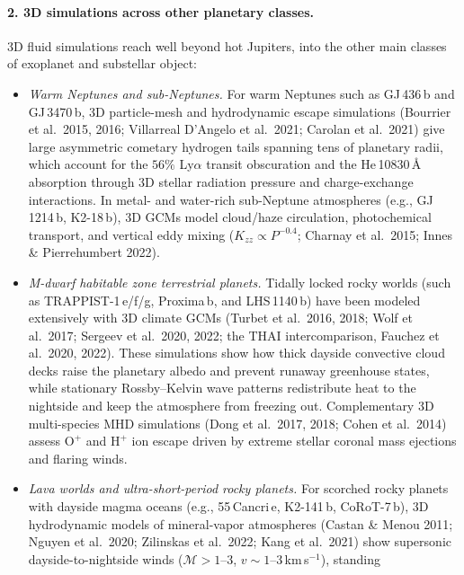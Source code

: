 \documentclass[english,a4paper]{my_memo}
\begin{document}
\paragraph{2. 3D simulations across other planetary classes.}
3D fluid simulations reach well beyond hot Jupiters, into the other main
classes of exoplanet and substellar object:

\begin{itemize}
\item \emph{Warm Neptunes and sub-Neptunes.}
      For warm Neptunes such as GJ\,436\,b and GJ\,3470\,b, 3D particle-mesh
      and hydrodynamic escape simulations (Bourrier et al.\ 2015, 2016;
      Villarreal D'Angelo et al.\ 2021; Carolan et al.\ 2021) give large
      asymmetric cometary hydrogen tails spanning tens of planetary radii,
      which account for the $56\%$ Ly$\alpha$ transit obscuration and the
      He\,10830\,\AA{} absorption through 3D stellar radiation pressure and
      charge-exchange interactions. In metal- and water-rich sub-Neptune
      atmospheres (e.g., GJ\,1214\,b, K2-18\,b), 3D GCMs model cloud/haze
      circulation, photochemical transport, and vertical eddy mixing
      ($K_{zz} \propto P^{-0.4}$; Charnay et al.\ 2015; Innes \&
      Pierrehumbert 2022).
\item \emph{M-dwarf habitable zone terrestrial planets.}
      Tidally locked rocky worlds (such as TRAPPIST-1\,e/f/g, Proxima\,b, and
      LHS\,1140\,b) have been modeled extensively with 3D climate GCMs
      (Turbet et al.\ 2016, 2018; Wolf et al.\ 2017; Sergeev et al.\ 2020,
      2022; the THAI intercomparison, Fauchez et al.\ 2020, 2022). These
      simulations show how thick dayside convective cloud decks raise the
      planetary albedo and prevent runaway greenhouse states, while
      stationary Rossby--Kelvin wave patterns redistribute heat to the
      nightside and keep the atmosphere from freezing out. Complementary
      3D multi-species MHD simulations (Dong et al.\ 2017, 2018; Cohen et
      al.\ 2014) assess $\mathrm{O}^+$ and $\mathrm{H}^+$ ion escape driven
      by extreme stellar coronal mass ejections and flaring winds.
\item \emph{Lava worlds and ultra-short-period rocky planets.}
      For scorched rocky planets with dayside magma oceans (e.g., 55\,Cancri\,e,
      K2-141\,b, CoRoT-7\,b), 3D hydrodynamic models of mineral-vapor
      atmospheres (Castan \& Menou 2011; Nguyen et al.\ 2020; Zilinskas et
      al.\ 2022; Kang et al.\ 2021) show supersonic dayside-to-nightside
      winds ($\mathcal{M} > 1$--$3$, $v \sim 1$--$3$\,km\,s$^{-1}$), standing

\end{itemize}
\end{document}
